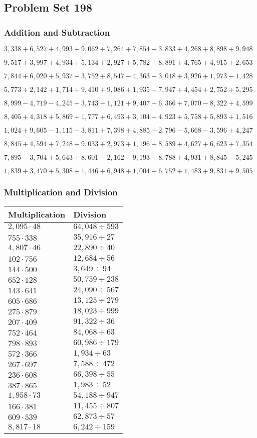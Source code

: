 \hypertarget{problem-set-198}{%
\subsection{Problem Set 198}\label{problem-set-198}}

\hypertarget{addition-and-subtraction}{%
\subsubsection{Addition and
Subtraction}\label{addition-and-subtraction}}

\(3,338+6,527+4,993+9,062+7,264+7,854+3,833+4,268+8,898+9,948\)

\(9,517+3,997+4,934+5,134+2,927+5,782+8,891+4,765+4,915+2,653\)

\(7,844+6,020+5,937-3,752+8,547-4,363-3,018+3,926+1,973-1,428\)

\(5,773+2,142+1,714+9,410+9,086+1,935+7,947+4,454+2,752+5,295\)

\(8,999-4,719-4,245+3,743-1,121+9,407+6,366+7,070-8,322+4,599\)

\(8,405+4,318+5,869+1,777+6,493+3,104+4,923+5,758+5,893+1,516\)

\(1,024+9,605-1,115-3,811+7,398+4,885+2,796-5,668-3,596+4,247\)

\(8,845+4,594+7,248+9,033+2,973+1,196+8,589+4,627+6,623+7,354\)

\(7,895-3,704+5,643+8,601-2,162-9,193+8,788+4,931+8,845-5,245\)

\(1,839+3,470+5,308+1,446+6,948+1,004+6,752+1,483+9,831+9,505\)

\hypertarget{multiplication-and-division}{%
\subsubsection{Multiplication and
Division}\label{multiplication-and-division}}

\begin{longtable}[]{@{}ll@{}}
\toprule
Multiplication & Division\tabularnewline
\midrule
\endhead
\(2,095\cdot48\) & \(64,048÷593\)\tabularnewline
\(755\cdot338\) & \(35,916÷27\)\tabularnewline
\(4,807\cdot46\) & \(22,890÷40\)\tabularnewline
\(102\cdot756\) & \(12,684÷56\)\tabularnewline
\(144\cdot500\) & \(3,649÷94\)\tabularnewline
\(652\cdot128\) & \(50,759÷238\)\tabularnewline
\(143\cdot641\) & \(24,090÷567\)\tabularnewline
\(605\cdot686\) & \(13,125÷279\)\tabularnewline
\(275\cdot879\) & \(18,023÷999\)\tabularnewline
\(207\cdot409\) & \(91,322÷36\)\tabularnewline
\(752\cdot464\) & \(84,068÷63\)\tabularnewline
\(798\cdot893\) & \(60,986÷179\)\tabularnewline
\(572\cdot366\) & \(1,934÷63\)\tabularnewline
\(267\cdot697\) & \(7,588÷472\)\tabularnewline
\(236\cdot608\) & \(66,398÷55\)\tabularnewline
\(387\cdot865\) & \(1,983÷52\)\tabularnewline
\(1,958\cdot73\) & \(54,188÷947\)\tabularnewline
\(166\cdot381\) & \(11,455÷807\)\tabularnewline
\(609\cdot539\) & \(62,873÷57\)\tabularnewline
\(8,817\cdot18\) & \(6,242÷159\)\tabularnewline
\bottomrule
\end{longtable}
